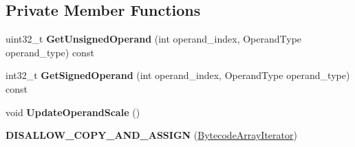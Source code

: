 \subsection*{Private Member Functions}
\begin{DoxyCompactItemize}
\item 
uint32\+\_\+t {\bfseries Get\+Unsigned\+Operand} (int operand\+\_\+index, Operand\+Type operand\+\_\+type) const \hypertarget{classv8_1_1internal_1_1interpreter_1_1_bytecode_array_iterator_a05ce5db7312400f05617e833e5eaf46c}{}\label{classv8_1_1internal_1_1interpreter_1_1_bytecode_array_iterator_a05ce5db7312400f05617e833e5eaf46c}

\item 
int32\+\_\+t {\bfseries Get\+Signed\+Operand} (int operand\+\_\+index, Operand\+Type operand\+\_\+type) const \hypertarget{classv8_1_1internal_1_1interpreter_1_1_bytecode_array_iterator_a945aef2cb76b1284c6b5c4bef3ac3cc3}{}\label{classv8_1_1internal_1_1interpreter_1_1_bytecode_array_iterator_a945aef2cb76b1284c6b5c4bef3ac3cc3}

\item 
void {\bfseries Update\+Operand\+Scale} ()\hypertarget{classv8_1_1internal_1_1interpreter_1_1_bytecode_array_iterator_a87ec734cd633f551d00e04d2b8dfe2c6}{}\label{classv8_1_1internal_1_1interpreter_1_1_bytecode_array_iterator_a87ec734cd633f551d00e04d2b8dfe2c6}

\item 
{\bfseries D\+I\+S\+A\+L\+L\+O\+W\+\_\+\+C\+O\+P\+Y\+\_\+\+A\+N\+D\+\_\+\+A\+S\+S\+I\+GN} (\hyperlink{classv8_1_1internal_1_1interpreter_1_1_bytecode_array_iterator}{Bytecode\+Array\+Iterator})\hypertarget{classv8_1_1internal_1_1interpreter_1_1_bytecode_array_iterator_a2e7614acdb5a4860395cd718fb79ae94}{}\label{classv8_1_1internal_1_1interpreter_1_1_bytecode_array_iterator_a2e7614acdb5a4860395cd718fb79ae94}

\end{DoxyCompactItemize}
